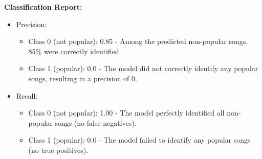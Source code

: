 \begin{itemize}
        \textbf{Classification Report: }
        \begin{itemize}
            \item Precision: 
                \begin{itemize}
                    \item Class 0 (not popular): 0.85 - Among the predicted non-popular songs, 85\% were correctly identified.
                    \item Class 1 (popular): 0.0 - The model did not correctly identify any popular songs, resulting in a precision of 0.
                \end{itemize}
            \item Recall:
                \begin{itemize}
                    \item Class 0 (not popular): 1.00 - The model perfectly identified all non-popular songs (no false negatives).
                    \item Class 1 (popular): 0.0 - The model failed to identify any popular songs (no true positives).


\end{itemize}
\end{itemize}
\end{itemize}
